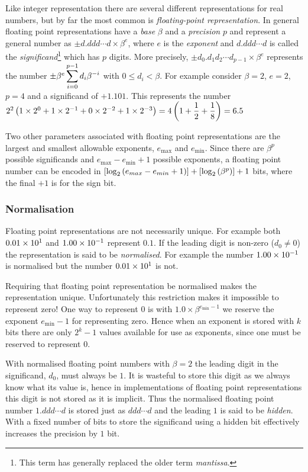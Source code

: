 Like integer representation there are several different representations for
real numbers, but by far the most common is \emph{floating-point
  representation}. In general floating point representations have a
\emph{base} $\beta$ and a \emph{precision} $p$ and represent a general number
as $\pm d.ddd \cdots d \times \beta^{e}$, where $e$ is the \emph{exponent} and
$d.ddd \cdots d$ is called the \emph{significand}\footnote{This term has
  generally replaced the older term \emph{mantissa}.} which has $p$ digits.
More precisely, $\pm d_{0}.d_{1}d_{2} \cdots d_{p-1} \times \beta^{e}$
represents the number $\pm\beta^{e} \displaystyle\sum _{i=0}^{p-1}d_{i}\beta^{-i}$ with $0
\leq d_{i} < \beta$. For example consider $\beta=2$, $e=2$, $p=4$ and a
significand of $+1.101$. This represents the number $2^{2}\left( 1 \times
  2^{0} + 1 \times 2^{-1} + 0 \times 2^{-2} + 1 \times 2^{-3} \right) = 4\left( 1 +
  \dfrac{1}{2} + \dfrac{1}{8} \right) = 6.5$

Two other parameters associated with floating point representations are the
largest and smallest allowable exponents, $e_{\text{max}}$ and
$e_{\text{min}}$. Since there are $\beta^{p}$ possible significands and
$e_{\text{max}} - e_{\text{min}} +1$ possible exponents, a floating point
number can be encoded in $\left[ \log_{2}\left( e_{max}-e_{min}+1 \right) \right]+
\left[ \log_{2} \left( \beta^{p} \right) \right]+1$ bits, where the final $+1$ is for the
sign bit.

\subsubsection{Normalisation}
\label{sec:normalisation}

Floating point representations are not necessarily unique. For example both
$0.01 \times  10^{1}  $ and $1.00 \times  10^{-1}  $ represent $0.1$. If the leading digit
is non-zero (\ie $d_{0}\neq0$) the representation is said to be
\emph{normalised}. For example the number $1.00 \times  10^{-1}  $ is normalised but
the number $0.01 \times  10^{1}  $ is not.

Requiring that floating point representation be normalised makes the
representation unique. Unfortunately this restriction makes it impossible to
represent zero! One way to represent $0$ is with $1.0 \times
\beta^{e_{\text{min}}-1}$ \ie we reserve the exponent $e_{\text{min}}-1$ for
representing zero. Hence when an exponent is stored with $k$ bits there are
only $2^{k}-1 $ values available for use as exponents, since one must be
reserved to represent $0$.

With normalised floating point numbers with $\beta=2$ the leading
digit in the significand, $d_{0}$, must always be $1$. It is wasteful
to store this digit as we always know what its value is, hence in
implementations of floating point representations this digit is not
stored as it is implicit. Thus the normalised floating point number
$1.ddd \cdots d$ is stored just as $ddd \cdots d$ and the leading $1$
is said to be \emph{hidden}. With a fixed number of bits to store the
significand using a hidden bit effectively increases the precision by
$1$ bit.

